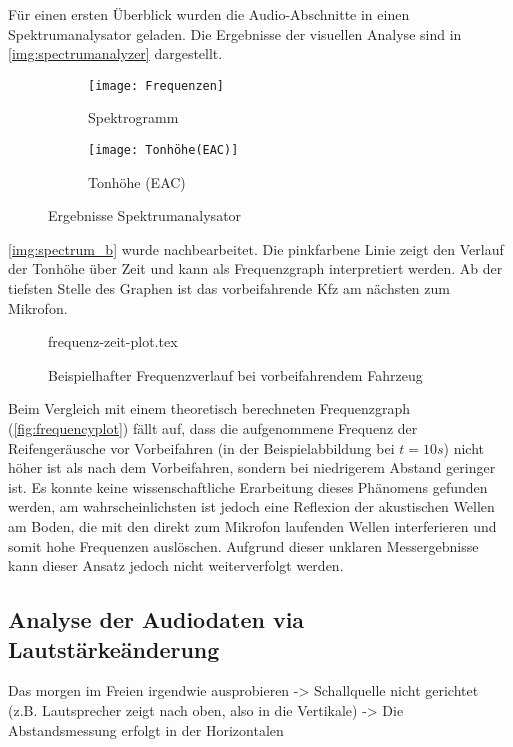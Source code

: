 Für einen ersten Überblick wurden die Audio-Abschnitte in einen Spektrumanalysator geladen. Die Ergebnisse der visuellen Analyse sind in \autoref{img:spectrumanalyzer} dargestellt.

\begin{figure}[h]
    \begin{subfigure}{.5\textwidth}
        \centering
        \texttt{[image: Frequenzen]}
        \caption{Spektrogramm}
    \end{subfigure}
    \begin{subfigure}{.5\textwidth}
        \centering
        \texttt{[image: Tonhöhe(EAC)]}
        \caption{Tonhöhe (EAC)}
        \label{img:spectrum_b}
    \end{subfigure}
    \caption{Ergebnisse Spektrumanalysator}
    \label{img:spectrumanalyzer}
\end{figure}

\autoref{img:spectrum_b} wurde nachbearbeitet. Die pinkfarbene Linie zeigt den Verlauf der Tonhöhe über Zeit und kann als Frequenzgraph interpretiert werden. Ab der tiefsten Stelle des Graphen ist das vorbeifahrende Kfz am nächsten zum Mikrofon.

\begin{figure}[h]
    \centering
    {frequenz-zeit-plot.tex}
    \caption{Beispielhafter Frequenzverlauf bei vorbeifahrendem Fahrzeug}
    \label{fig:frequencyplot}
\end{figure}

Beim Vergleich mit einem theoretisch berechneten Frequenzgraph (\autoref{fig:frequencyplot}) fällt auf, dass die aufgenommene Frequenz der Reifengeräusche vor Vorbeifahren (in der Beispielabbildung bei \(t = 10 s\)) nicht höher ist als nach dem Vorbeifahren, sondern bei niedrigerem Abstand geringer ist. Es konnte keine wissenschaftliche Erarbeitung dieses Phänomens gefunden werden, am wahrscheinlichsten ist jedoch eine Reflexion der akustischen Wellen am Boden, die mit den direkt zum Mikrofon laufenden Wellen interferieren und somit hohe Frequenzen auslöschen. Aufgrund dieser unklaren Messergebnisse kann dieser Ansatz jedoch nicht weiterverfolgt werden.

\subsection{Analyse der Audiodaten via Lautstärkeänderung}


Das morgen im Freien irgendwie ausprobieren
-> Schallquelle nicht gerichtet (z.B. Lautsprecher zeigt nach oben, also in die Vertikale)
-> Die Abstandsmessung erfolgt in der Horizontalen